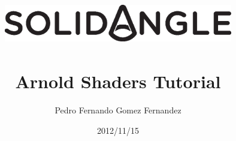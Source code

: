 \documentclass[12pt,a4paper,titlepage]{article}
\begin{document}
\renewcommand{\listingscaption}{Example}
\renewcommand{\theFancyVerbLine}{\sffamily\textcolor[rgb]{0.5,0.5,0.5}{\scriptsize\arabic{FancyVerbLine}}}

\title{\includegraphics[width=10cm]{SOLID_ANGLE_logotipo.eps}\\ \colorbox{white}{} \\ \bfseries\huge Arnold Shaders Tutorial}
\author{Pedro Fernando Gomez Fernandez}
\date{2012/11/15}
\maketitle

\tableofcontents
\newpage

\setcounter{page}{1}






\end{document}
